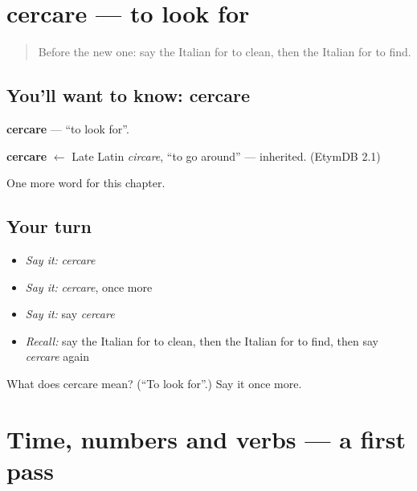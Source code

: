 \section[cercare]{cercare — to look for}

\label{lesson:IT-C136-cercare}



\begin{quote}
Before the new one: say the Italian for to clean, then the Italian for to find.
\end{quote}

\subsection*{You'll want to know: cercare}
\textbf{cercare} — \textquotedblleft{}to look for\textquotedblright{}.

\begin{cousinweb}
\textbf{cercare} $\leftarrow$ Late Latin \emph{circare}, \textquotedblleft{}to go around\textquotedblright{} — inherited. (EtymDB 2.1)
\end{cousinweb}

\begin{grammarlens}[title={What you've built}]
One more word for this chapter.
\end{grammarlens}

\subsection*{Your turn}
\begin{itemize}
\raggedright
  \item \emph{Say it:} \emph{cercare}
  \item \emph{Say it:} \emph{cercare}, once more
  \item \emph{Say it:} say \emph{cercare}
  \item \emph{Recall:} say the Italian for to clean, then the Italian for to find, then say \emph{cercare} again
\end{itemize}

\begin{tcolorbox}[breakable,colback=teal!4,colframe=teal!35!black,title={Before you move on}]
What does cercare mean? (\textquotedblleft{}To look for\textquotedblright{}.) Say it once more.
\end{tcolorbox}
\section[(dialogue)]{Time, numbers and verbs — a first pass}

